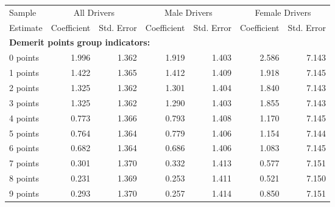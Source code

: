 
\begin{table}%
\centering 
\begin{tabular}{l r r r r r r} 

\hline 
 

Sample 
 & \multicolumn{2}{c}{All  Drivers}  & \multicolumn{2}{c}{Male  Drivers}  & \multicolumn{2}{c}{Female  Drivers}   \\ 
 

 \cmidrule(lr){1-1}\cmidrule(lr){2-3}\cmidrule(lr){4-5}\cmidrule(lr){6-7} 

Estimate  & Coefficient & Std. Error  & Coefficient & Std. Error  & Coefficient & Std. Error   \\ 
 

\hline 
 
\multicolumn{4}{l}{\textbf{Demerit points group indicators:}}  \\ 
 
0 points  &  1.996  &  1.362  &  1.919  &  1.403  &  2.586  &  7.143   \\ 
 
1 points  &  1.422  &  1.365  &  1.412  &  1.409  &  1.918  &  7.145   \\ 
 
2 points  &  1.325  &  1.362  &  1.301  &  1.404  &  1.840  &  7.143   \\ 
 
3 points  &  1.325  &  1.362  &  1.290  &  1.403  &  1.855  &  7.143   \\ 
 
4 points  &  0.773  &  1.366  &  0.793  &  1.408  &  1.170  &  7.145   \\ 
 
5 points  &  0.764  &  1.364  &  0.779  &  1.406  &  1.154  &  7.144   \\ 
 
6 points  &  0.682  &  1.364  &  0.686  &  1.406  &  1.083  &  7.145   \\ 
 
7 points  &  0.301  &  1.370  &  0.332  &  1.413  &  0.577  &  7.151   \\ 
 
8 points  &  0.231  &  1.369  &  0.253  &  1.411  &  0.521  &  7.150   \\ 
 
9 points  &  0.293  &  1.370  &  0.257  &  1.414  &  0.850  &  7.151   \\ 
 

\end{tabular}
\end{table}
